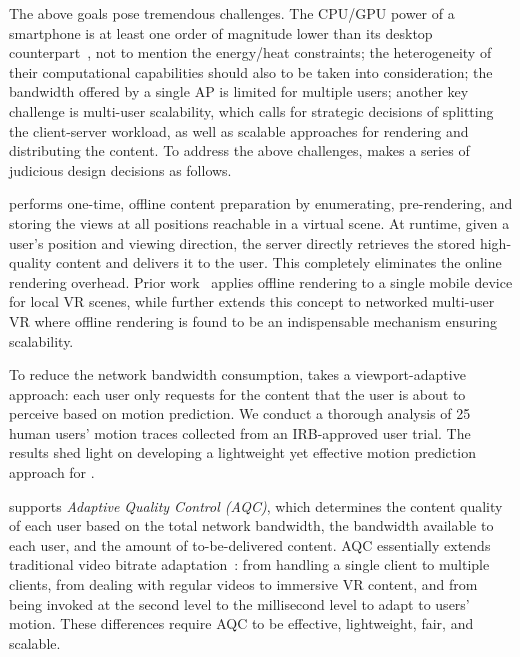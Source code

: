 The above goals pose tremendous challenges. The CPU/GPU power of a smartphone is at least one order of magnitude lower than its desktop counterpart~\cite{satyanarayanan2019computing}, not to mention the energy/heat constraints;
the heterogeneity of their computational capabilities should also to be taken into consideration;
the bandwidth offered by a single AP is limited for multiple users;
another key challenge is multi-user scalability, which calls for strategic decisions of splitting the client-server workload,
as well as scalable approaches for rendering and distributing the content.
To address the above challenges, \firefly makes a series of judicious design decisions as follows.

\BULLET \firefly performs one-time, offline content preparation by enumerating, pre-rendering, and storing
the views at all positions reachable in a virtual scene. At runtime, given a user's position and viewing direction, the server directly retrieves the stored high-quality content and delivers it to the user. This completely eliminates the online rendering overhead.
Prior work~\cite{boos2016flashback} applies offline rendering to a single mobile device for local VR scenes, while \firefly further extends this concept to networked multi-user VR where offline rendering is found to be an indispensable mechanism ensuring scalability.

\BULLET To reduce the network bandwidth consumption, \firefly takes a viewport-adaptive approach: each user only requests for the content that the user is about to perceive based on motion prediction.
We conduct a thorough analysis of 25 human users' motion traces collected from an IRB-approved user trial.
The results shed light on developing a lightweight yet effective motion prediction approach for \firefly.

\BULLET \firefly supports \emph{Adaptive Quality Control (AQC)}, which determines the content quality of each user based on the total network bandwidth, the bandwidth available to each user, and the amount of to-be-delivered content.
AQC essentially extends traditional video bitrate adaptation~\cite{jiang2012improving,huang2014buffer,yin2015control,mao2017neural}:
from handling a single client to multiple clients,
from dealing with regular videos to immersive VR content, and
from being invoked at the second level to the millisecond level to adapt to users' motion.
These differences require AQC to be effective, lightweight, fair, and scalable.


